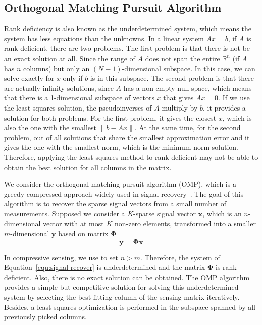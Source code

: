 \subsection{Orthogonal Matching Pursuit Algorithm}
Rank deficiency is also known as the underdetermined system, which means the system has less equations than the unknowns. In a linear system $Ax=b$, if $A$ is rank deficient, there are two problems. The first problem is that there is not be an exact solution at all. Since the range of $A$ does not span the entire $\mathbb{R}^n$ (if $A$ has $n$ columns) but only an $(N-1)$-dimensional subspace. In this case, we can solve exactly for $x$ only if $b$ is in this subspace. The second problem is that there are actually infinity solutions, since $A$ has a non-empty null space, which means that there is a 1-dimensional subspace of vectors $x$ that gives $Ax=0$. If we use the least-squares solution, the pseudoinverses of $A$ multiply by $b$, it provides a solution for both problems. For the first problem, it gives the closest $x$, which is also the one with the smallest $\|b-Ax\|$. At the same time, for the second problem, out of all solutions that share the smallest approximation error and it gives the one with the smallest norm, which is the minimum-norm solution. Therefore, applying the least-squares method to rank deficient may not be able to obtain the best solution for all columns in the matrix. 
\par We consider the orthogonal matching pursuit algorithm (OMP), which is a greedy compressed approach widely used in signal recovery~\citep{MS:93}. The goal of this algorithm is to recover the sparse signal vectors from a small number of measurements. Supposed we consider a $K$-sparse signal vector $\mathbf{x}$, which is an $n$-dimensional vector with at most $K$ non-zero elements, transformed into a smaller $m$-dimensional $\mathbf{y}$ based on matrix $\mathbf{\Phi}$
\begin{equation}
    \label{equ:signal-recover}
    \mathbf{y}=\mathbf{\Phi} \mathbf{x}
\end{equation}
\par In compressive sensing, we use to set $n > m$. Therefore, the system of Equation~\ref{equ:signal-recover} is underdetermined and the matrix $\mathbf{\Phi}$ is rank deficient. Also, there is no exact solution can be obtained. The OMP algorithm provides a simple but competitive solution for solving this underdetermined system by selecting the best fitting column of the sensing matrix iteratively. Besides, a least-squares optimization is performed in the subspace spanned by all previously picked columns. 

